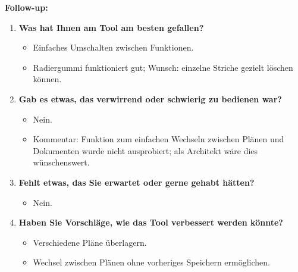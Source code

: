 \textbf{Follow-up:}
\begin{enumerate}
    \item \textbf{Was hat Ihnen am Tool am besten gefallen?}
    \begin{itemize}
        \item Einfaches Umschalten zwischen Funktionen.
        \item Radiergummi funktioniert gut; Wunsch: einzelne Striche gezielt löschen können.
    \end{itemize}

    \item \textbf{Gab es etwas, das verwirrend oder schwierig zu bedienen war?}
    \begin{itemize}
        \item Nein.
        \item Kommentar: Funktion zum einfachen Wechseln zwischen Plänen und Dokumenten wurde nicht ausprobiert; als Architekt wäre dies wünschenswert.
    \end{itemize}

    \item \textbf{Fehlt etwas, das Sie erwartet oder gerne gehabt hätten?}
    \begin{itemize}
        \item Nein.
    \end{itemize}

    \item \textbf{Haben Sie Vorschläge, wie das Tool verbessert werden könnte?}
    \begin{itemize}
        \item Verschiedene Pläne überlagern.
        \item Wechsel zwischen Plänen ohne vorheriges Speichern ermöglichen.
    \end{itemize}
\end{enumerate}

\clearpage
